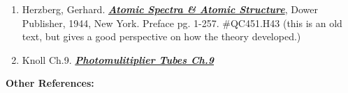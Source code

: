 \documentclass{../lab}
\begin{document}
\begin{enumerate}
    \item Herzberg, Gerhard. \emph{\href{http://physics111.lib.berkeley.edu/Physics111/Reprints/ATM/02-2ndEd-Atomic\_Spectra\_and\_Atomic\_Structure.pdf}{\textbf{Atomic Spectra \& Atomic Structure}}}, Dower Publisher, 1944, New York. Preface pg. 1-257. \#QC451.H43 (this is an old text, but gives a good perspective on how the theory developed.)

    \item Knoll Ch.9. \emph{\href{http://physics111.lib.berkeley.edu/Physics111/Reprints/Knoll-Radiation\%20Detection\%20&\%20Measurement/01-Radiation\_Detection\_and\_Measurement\_CH\_09.pdf}{\textbf{Photomulitiplier Tubes Ch.9}}}

\end{enumerate}

\noindent\textbf{Other References:}
\end{document}
